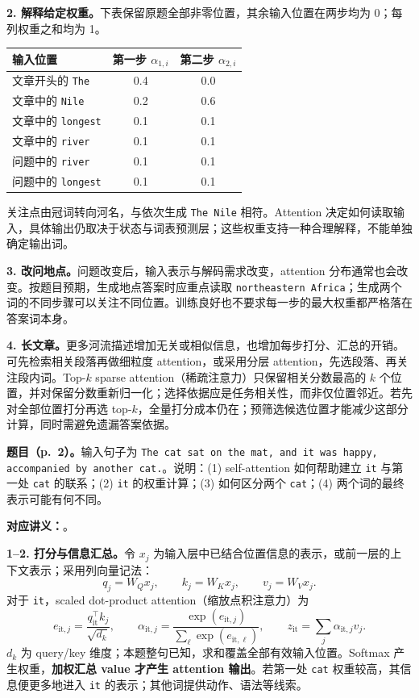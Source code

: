 \textbf{2. 解释给定权重。}下表保留原题全部非零位置，其余输入位置在两步均为 0；每列权重之和均为 1。
\begin{center}
\small
\begin{tabular}{@{}lcc@{}}
\toprule
输入位置 & 第一步 $\alpha_{1,i}$ & 第二步 $\alpha_{2,i}$ \\
\midrule
文章开头的 \texttt{The} & 0.4 & 0.0 \\
文章中的 \texttt{Nile} & 0.2 & 0.6 \\
文章中的 \texttt{longest} & 0.1 & 0.1 \\
文章中的 \texttt{river} & 0.1 & 0.1 \\
问题中的 \texttt{river} & 0.1 & 0.1 \\
问题中的 \texttt{longest} & 0.1 & 0.1 \\
\bottomrule
\end{tabular}
\end{center}
关注点由冠词转向河名，与依次生成 \texttt{The Nile} 相符。Attention 决定如何读取输入，具体输出仍取决于状态与词表预测层；这些权重支持一种合理解释，不能单独确定输出词。

\textbf{3. 改问地点。}问题改变后，输入表示与解码需求改变，attention 分布通常也会改变。按题目预期，生成地点答案时应重点读取 \texttt{northeastern Africa}；生成两个词的不同步骤可以关注不同位置。训练良好也不要求每一步的最大权重都严格落在答案词本身。

\textbf{4. 长文章。}更多河流描述增加无关或相似信息，也增加每步打分、汇总的开销。可先检索相关段落再做细粒度 attention，或采用分层 attention，先选段落、再关注段内词。Top-$k$ sparse attention（稀疏注意力）只保留相关分数最高的 $k$ 个位置，并对保留分数重新归一化；选择依据应是任务相关性，而非仅位置邻近。若先对全部位置打分再选 top-$k$，全量打分成本仍在；预筛选候选位置才能减少这部分计算，同时需避免遗漏答案依据。

\nopagebreak[4]
\textbf{题目（p.~2）。}输入句子为 \texttt{The cat sat on the mat, and it was happy, accompanied by another cat.}。说明：(1) self-attention 如何帮助建立 \texttt{it} 与第一处 \texttt{cat} 的联系；(2) \texttt{it} 的权重计算；(3) 如何区分两个 \texttt{cat}；(4) 两个词的最终表示可能有何不同。

\textbf{对应讲义：}。

\textbf{1--2. 打分与信息汇总。}令 $x_j$ 为输入层中已结合位置信息的表示，或前一层的上下文表示；采用列向量记法：
\[
 q_j=W_Qx_j,\qquad k_j=W_Kx_j,\qquad v_j=W_Vx_j.
\]
对于 \texttt{it}，scaled dot-product attention（缩放点积注意力）为
\[
 e_{\mathrm{it},j}=\frac{q_{\mathrm{it}}^\top k_j}{\sqrt{d_k}},\qquad
 \alpha_{\mathrm{it},j}=\frac{\exp(e_{\mathrm{it},j})}{\sum_\ell\exp(e_{\mathrm{it},\ell})},\qquad
 z_{\mathrm{it}}=\sum_j\alpha_{\mathrm{it},j}v_j.
\]
$d_k$ 为 query/key 维度；本题整句已知，求和覆盖全部有效输入位置。Softmax 产生权重，\textbf{加权汇总 value 才产生 attention 输出}。若第一处 \texttt{cat} 权重较高，其信息便更多地进入 \texttt{it} 的表示；其他词提供动作、语法等线索。

